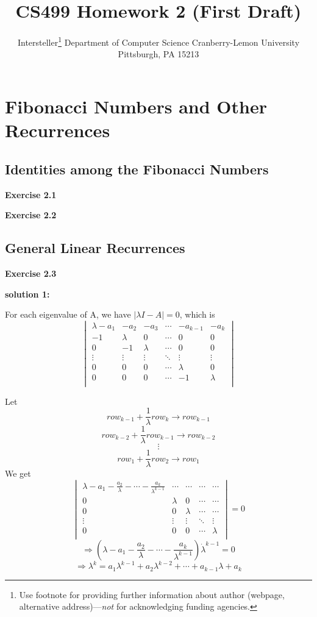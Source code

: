 \documentclass{article} %
\title{CS499 Homework 2 (First Draft)}
\author{
	Intersteller\thanks{ Use footnote for providing further information
		about author (webpage, alternative address)---\emph{not} for acknowledging
		funding agencies.}
	Department of Computer Science
	Cranberry-Lemon University
	Pittsburgh, PA 15213
}
\begin{document}
	
	
	\maketitle
	
	\section{Fibonacci Numbers and Other Recurrences}
	\subsection{Identities among the Fibonacci Numbers}
	\textbf{Exercise 2.1}\par
	



	\textbf{Exercise 2.2}\par






	
	



	
	\subsection{General Linear Recurrences}
	\textbf{Exercise 2.3}\par
	\textbf{solution 1:}\par
	For each eigenvalue of A, we have $|\lambda I-A|=0$, which is
	$$
 \begin{vmatrix}
   \lambda -a_1 & -a_2 & -a_3 & \cdots &-a_{k-1} & -a_k \\
   -1 & \lambda & 0 & \cdots & 0 & 0 \\
   0 & -1 & \lambda & \cdots & 0 & 0 \\
   \vdots & \vdots & \vdots & \ddots & \vdots & \vdots \\
   0 & 0 & 0 & \cdots & \lambda & 0\\
   0 & 0 & 0 & \cdots & -1 & \lambda\\
  \end{vmatrix}
$$

	Let 
	$$ row_{k-1} + \frac{1}{\lambda} row_k \rightarrow row_{k-1}$$
	$$row_{k-2} +\frac{1}{\lambda} row_{k-1} \rightarrow row_{k-2}$$
	$$\vdots$$
	$$row_1+\frac{1}{\lambda}row_2 \rightarrow row_1$$
	We get 
	$$
 \begin{vmatrix}
   \lambda -a_1-\frac{a_2}{\lambda}-\cdots - \frac{a_k}{\lambda ^{k-1}} & \cdots & \cdots & \cdots & \cdots  \\
   0 & \lambda & 0 & \cdots & \cdots \\
   0 & 0 & \lambda & \cdots & \cdots \\
   \vdots & \vdots & \vdots & \ddots & \vdots \\
   0 & 0 & 0 & \cdots & \lambda \\
  \end{vmatrix}=0
$$
$$\Rightarrow (\lambda -a_1-\frac{a_2}{\lambda}-\cdots - \frac{a_k}{\lambda ^{k-1}})\dot \lambda^{k-1}=0$$
$$\Rightarrow \lambda^{k}=a_1 \lambda^{k-1}+a_2 \lambda^{k-2}+\cdots + a_{k-1}\lambda +a_k $$
\end{document}
